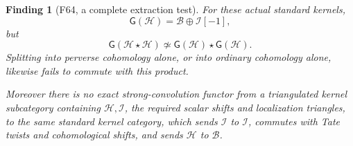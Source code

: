 \documentclass[11pt,a4paper]{article}
\newcommand{\fid}[1]{\textsf{#1}}\newcommand{\gate}[1]{\textsf{#1}}
\theoremstyle{named}\newtheorem{finding}{Finding}[section]
\theoremstyle{definition}\newtheorem{definition}[finding]{Definition}
\theoremstyle{remark}\newtheorem{remark}[finding]{Remark}
\begin{document}
\begin{finding}[\fid{F64}, a complete extraction test]
\label{f:weightextraction}
For these actual standard kernels,
\begin{equation}\label{eq:weightgradedH}
                  \mathsf G(\mathcal H)
                     =\mathcal B\oplus\mathcal I[-1],
\end{equation}
but
\begin{equation}\label{eq:weightgradednotmonoidal}
 \mathsf G(\mathcal H\star\mathcal H)
       \not\simeq
 \mathsf G(\mathcal H)\star\mathsf G(\mathcal H).
\end{equation}
Splitting into perverse cohomology alone, or into ordinary
cohomology alone, likewise fails to commute with this product.

Moreover there is no exact strong-convolution functor from
a triangulated kernel subcategory containing
\(\mathcal H,\mathcal I\), the required scalar shifts and
localization triangles, to the same standard kernel category,
which sends \(\mathcal I\) to \(\mathcal I\), commutes with
Tate twists and cohomological shifts, and sends
\(\mathcal H\) to \(\mathcal B\).
\end{finding}
\end{document}
